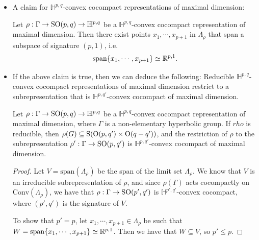 \documentclass{report}
\begin{document}
\begin{itemize}
\begin{proof}
        We claim that the element on the right-hand side is trivial, i.e.\ $W = \{0\}$.
        Indeed, for each two distinct $y, z \in \partial_\infty \Gamma$, we have that $\xi^-(y) \cap \xi^-(z)$ is a subspace of codimension at most one in the hyperplane $\xi^-(y)$.
        This follows from the fact that $\xi^-(y) \neq \xi^-(z)$ for $y \neq z$, since $\xi^+(y) \in \xi^-(y)$ and $\xi^+(y) \cap \xi^-(z) = \{0\}$.
        The same argument applies to the intersection of a finite number of hyperplanes $\xi^-(y_1), \cdots, \xi^-(y_n)$, where $y_i \in \partial_\infty \Gamma$ are distinct.
        Since $\Gamma$ is non-elementary, $\partial_\infty \Gamma$ is infinite and due to finite-dimensionality, we have that the intersection of all hyperplanes $\xi^-(y)$ for $y \in \partial_\infty \Gamma$ is trivial, i.e.\ $W = \{0\}$.
    \end{proof}
    \item A claim for $\mathbb H^{p,q}$-convex cocompact representations of maximal dimension:  
    \begin{claim}
        Let $\rho:\Gamma \to \operatorname{{\mathrm{SO}}}(p,q) \to \mathbb H^{p,q}$ be a $\mathbb H^{p,q}$-convex cocompact representation of maximal dimension.
        Then there exist points $x_1, \cdots, x_{p+1}$ in $\Lambda_\rho$ that span a subspace of signature $(p,1)$, i.e.\ 
        \[
        \operatorname{span}\{x_1, \cdots, x_{p+1}\} \simeq \mathbb R^{p,1}.
        \]
    \end{claim}
    \item If the above claim is true, then we can deduce the following:
    Reducible $\mathbb H^{p,q}$-convex cocompact representations of maximal dimension restrict to a subrepresentation that is $\mathbb H^{p,q'}$-convex cocompact of maximal dimension.
    \begin{lemma}
        Let $\rho:\Gamma \to \operatorname{{\mathrm{SO}}}(p,q) \to \mathbb H^{p,q}$ be a $\mathbb H^{p,q}$-convex cocompact representation of maximal dimension, where $\Gamma$ is a non-elementary hyperbolic group.
        If $rho$ is reducible, then $\rho(G) \subseteq \mathrm{S}(\operatorname{{\mathrm{O}}}(p,q') \times \operatorname{{\mathrm{O}}}(q-q'))$, and the restriction of $\rho$ to the subrepresentation $\rho': \Gamma \to \operatorname{{\mathrm{SO}}}(p,q')$ is $\mathbb H^{p,q'}$-convex cocompact of maximal dimension.
    \end{lemma}
    \begin{proof}
        Let $V = \mathrm{span}(\Lambda_\rho)$ be the span of the limit set $\Lambda_\rho$.
        We know that $V$ is an irreducible subrepresentation of $\rho$, and since $\rho(\Gamma)$ acts cocompactly on $\mathrm{Conv}(\Lambda_\rho)$, we have that $\rho: \Gamma \to \operatorname{{\mathrm{SO}}}(p', q')$ is $\mathbb H^{p',q'}$-convex cocompact, where $(p', q')$ is the signature of $V$.
        
        To show that $p' = p$, let $x_1, \cdots, x_{p+1} \in \Lambda_\rho$ be such that $W = \operatorname{span}\{x_1, \cdots, x_{p+1}\} \simeq \mathbb R^{p,1}$.
        Then we have that $W \subseteq V$, so $p' \leq p$.
    \end{proof}
\end{itemize}
\end{document}
